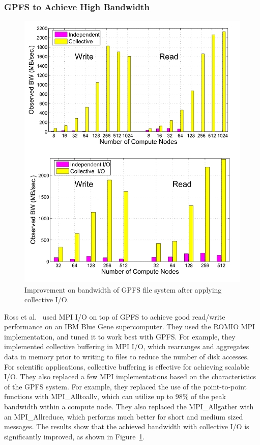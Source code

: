 \subsubsection{GPFS to Achieve High Bandwidth}
%
\begin{figure}
\centering
\includegraphics[width=0.99\columnwidth]{image/bw.png}
\caption{Improvement on bandwidth of GPFS file system after applying collective I/O.}
\label{fig:bw}
\end{figure}
%
Ross et al.~\cite{Yu2006} used MPI I/O on top of GPFS to achieve good read/write
performance on an IBM Blue Gene supercomputer.
%
They used the ROMIO MPI implementation, and tuned it to work best with GPFS.
%
For example, they implemented collective buffering in MPI I/O, which 
rearranges and aggregates data in memory prior to writing to files to 
reduce the number of disk accesses.
%
For scientific applications, collective buffering is effective for 
achieving scalable I/O.
%
They also replaced a few MPI implementations based on the characteristics
of the GPFS system.
%
For example, they replaced the use of the point-to-point functions with 
MPI\_Alltoallv, which can utilize up to 98\% of the peak bandwidth within 
a compute node.
%
They also replaced the MPI\_Allgather with an MPI\_Allreduce, 
which performs much better for short and medium sized messages. 
%
The results show that the achieved bandwidth with collective I/O is 
significantly improved, as shown in Figure~\ref{fig:bw}.




